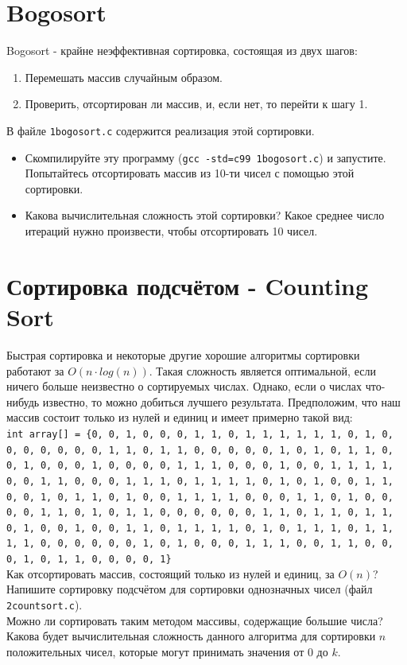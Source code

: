 \documentclass{article}
\begin{document}
\newpage
\section*{Bogosort}
Bogosort - крайне неэффективная сортировка, состоящая из двух шагов:
\begin{enumerate}
\item Перемешать массив случайным образом.
\item Проверить, отсортирован ли массив, и, если нет, то перейти к шагу 1.
\end{enumerate}
В файле \texttt{1bogosort.c} содержится реализация этой сортировки.
\begin{itemize}
\item Скомпилируйте эту программу (\texttt{gcc -std=c99 1bogosort.c}) и запустите. Попытайтесь отсортировать массив из 10-ти чисел с помощью этой сортировки.
\item Какова вычислительная сложность этой сортировки? Какое среднее число итераций нужно произвести, чтобы отсортировать 10 чисел.
\end{itemize}

\section*{Сортировка подсчётом - Counting Sort}
Быстрая сортировка и некоторые другие хорошие алгоритмы сортировки работают за $O(n \cdot log(n))$. Такая сложность является оптимальной, если ничего больше неизвестно о сортируемых числах. Однако, если о числах что-нибудь известно, то можно добиться лучшего результата. Предположим, что наш массив состоит только из нулей и единиц и имеет примерно такой вид: \\
\texttt{int array[] = \{0, 0, 1, 0, 0, 0, 1, 1, 0, 1, 1, 1, 1, 1, 1, 0, 1, 0, 0, 0, 0, 0, 0, 0, 1, 1, 0, 1, 1, 0, 0, 0, 0, 0, 1, 0, 1, 0, 1, 1, 0, 0, 1, 0, 0, 0, 1, 0, 0, 0, 0, 1, 1, 1, 0, 0, 0, 1, 0, 0, 1, 1, 1, 1, 0, 0, 1, 1, 0, 0, 0, 1, 1, 1, 0, 1, 1, 1, 1, 0, 1, 0, 1, 0, 0, 1, 1, 0, 0, 1, 0, 1, 1, 0, 1, 0, 0, 1, 1, 1, 1, 0, 0, 0, 1, 1, 0, 1, 0, 0, 0, 0, 1, 1, 0, 1, 0, 1, 1, 0, 0, 0, 0, 0, 0, 1, 1, 0, 1, 1, 0, 1, 1, 0, 1, 0, 0, 1, 0, 0, 1, 1, 0, 1, 1, 1, 1, 0, 1, 0, 1, 1, 1, 0, 1, 1, 1, 1, 0, 0, 0, 0, 0, 0, 1, 0, 1, 0, 0, 0, 1, 1, 1, 0, 0, 1, 1, 0, 0, 0, 1, 0, 1, 1, 0, 0, 0, 0, 1\}}\\
Как отсортировать массив, состоящий только из нулей и единиц, за $O(n)$?\\
Напишите сортировку подсчётом для сортировки однозначных чисел (файл \texttt{2countsort.c}).\\
Можно ли сортировать таким методом массивы, содержащие большие числа?\\
Какова будет вычислительная сложность данного алгоритма для сортировки $n$ положительных чисел, которые могут принимать значения от $0$ до $k$.
\end{document}
